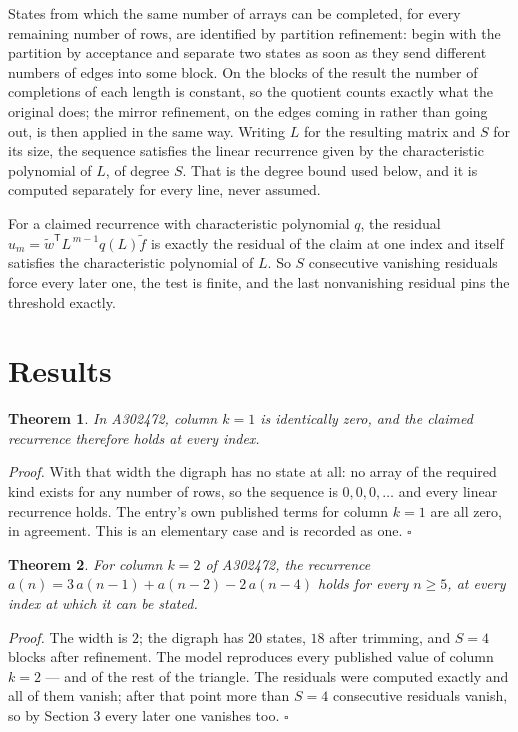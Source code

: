 \documentclass[11pt]{article}
\newtheorem{theorem}{Theorem}
\theoremstyle{definition}
\begin{document}
States from which the same number of arrays can be completed, for every remaining number of rows, are identified by partition refinement: begin with the partition by acceptance and separate two states as soon as they send different numbers of edges into some block. On the blocks of the result the number of completions of each length is constant, so the quotient counts exactly what the original does; the mirror refinement, on the edges coming in rather than going out, is then applied in the same way. Writing $L$ for the resulting matrix and $S$ for its size, the sequence satisfies the linear recurrence given by the characteristic polynomial of $L$, of degree $S$. That is the degree bound used below, and it is computed separately for every line, never assumed.

For a claimed recurrence with characteristic polynomial $q$, the residual $u_m = \tilde w^{\mathsf T}L^{\,m-1}q(L)\tilde f$ is exactly the residual of the claim at one index and itself satisfies the characteristic polynomial of $L$. So $S$ consecutive vanishing residuals force every later one, the test is finite, and the last nonvanishing residual pins the threshold exactly.

\section{Results}

\begin{theorem} In A302472, column $k = 1$ is identically zero, and the claimed recurrence therefore holds at every index.\end{theorem}

{\itshape Proof.} With that width the digraph has no state at all: no array of the required kind exists for any number of rows, so the sequence is $0,0,0,\dots$ and every linear recurrence holds. The entry's own published terms for column $k = 1$ are all zero, in agreement. This is an elementary case and is recorded as one. $\square$

\begin{theorem} For column $k = 2$ of A302472, the recurrence $a(n) = 3\,a(n-1) + a(n-2) - 2\,a(n-4)$ holds for every $n \ge 5$, at every index at which it can be stated.\end{theorem}

{\itshape Proof.} The width is $2$; the digraph has $20$ states, $18$ after trimming, and $S = 4$ blocks after refinement. The model reproduces every published value of column $k = 2$ --- and of the rest of the triangle. The residuals were computed exactly and all of them vanish; after that point more than $S = 4$ consecutive residuals vanish, so by Section 3 every later one vanishes too. $\square$
\end{document}
